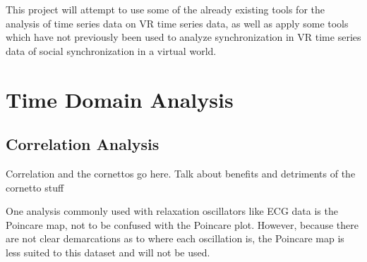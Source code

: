 \documentclass[12pt]{article}
\begin{document}

This project will attempt to use some of the already existing tools for the analysis of time series data on VR time series data, as well as apply some tools which have not previously been used to analyze synchronization in VR time series data of social synchronization in a virtual world.




\section{Time Domain Analysis}

\subsection{Correlation Analysis}




Correlation and the cornettos go here. Talk about benefits and detriments of the cornetto stuff

One analysis commonly used with relaxation oscillators like ECG data is the Poincare map, not to be confused with the Poincare plot. However, because there are not clear demarcations as to where each oscillation is, the Poincare map is less suited to this dataset and will not be used. %
\end{document}
